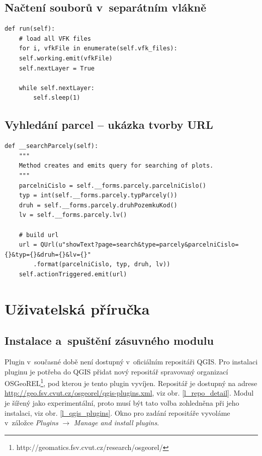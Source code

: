\documentclass[a4paper,12pt,oneside]{book}
\begin{document}
\section{Načtení souborů v~separátním vlákně}
\begin{lstlisting}[style=python, label=l_thread_run]
 def run(self):
    # load all VFK files
    for i, vfkFile in enumerate(self.vfk_files):
	self.working.emit(vfkFile)
	self.nextLayer = True

	while self.nextLayer:
	    self.sleep(1)
\end{lstlisting}

\section{Vyhledání parcel -- ukázka tvorby URL}
\begin{lstlisting}[style=python, label=l_search_parcely]
def __searchParcely(self):
    """
    Method creates and emits query for searching of plots.
    """
    parcelniCislo = self.__forms.parcely.parcelniCislo()
    typ = int(self.__forms.parcely.typParcely())
    druh = self.__forms.parcely.druhPozemkuKod()
    lv = self.__forms.parcely.lv()

    # build url
    url = QUrl(u"showText?page=search&type=parcely&parcelniCislo={}&typ={}&druh={}&lv={}"
		.format(parcelniCislo, typ, druh, lv))
    self.actionTriggered.emit(url)
\end{lstlisting}


\chapter{Uživatelská příručka}
\label{l_prirucka}

\section{Instalace a~spuštění zásuvného modulu}
Plugin v~současné době není dostupný v~oficiálním repositáři QGIS. Pro instalaci pluginu je potřeba do QGIS přidat nový repositář spravovaný organizací OSGeoREL\footnote{http://geomatics.fsv.cvut.cz/research/osgeorel/}, pod kterou je tento plugin vyvíjen. Repositář je dostupný na adrese \url{http://geo.fsv.cvut.cz/osgeorel/qgis-plugins.xml}, viz obr. \ref{l_repo_detail}. Modul je šířený jako experimentální, proto musí být tato volba zohledněna při jeho instalaci, viz obr. \ref{l_qgis_plugins}. Okno pro zadání repositáře vyvoláme v~záložce \textit{Plugins} $\rightarrow$ \textit{Manage and install plugins}.
\end{document}
